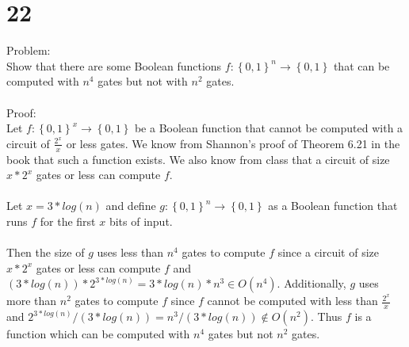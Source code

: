 \documentclass[letterpaper,notitlepage,twoside]{article}
\begin{document}
\section*{22}
Problem:
\\
Show that there are some Boolean functions $f: \left\{ 0,1 \right\}^n \rightarrow \left\{ 0,1 \right\}$ that can be computed with $n^4$ gates but not with $n^2$ gates.
\\\\
Proof:
\\
Let $f: \left\{ 0,1 \right\}^x \rightarrow \left\{ 0,1 \right\}$ be a Boolean function that cannot be computed with a circuit of $\frac{2^x}{x}$ or less gates. We know from Shannon's proof of Theorem 6.21 in the book that such a function exists. We also know from class that a circuit of size $x*2^x$ gates or less can compute $f$.
\\\\
Let $x = 3*log(n)$ and define $g: \left\{ 0,1 \right\}^n \rightarrow \left\{ 0,1 \right\}$ as a Boolean function that runs $f$ for the first $x$ bits of input.
\\\\
Then the size of $g$ uses less than $n^4$ gates to compute $f$ since a circuit of size $x*2^x$ gates or less can compute $f$ and $(3*log(n))*2^{3*log(n)} = 3*log(n)*n^3 \in O(n^4)$. Additionally, $g$ uses more than $n^2$ gates to compute $f$ since $f$ cannot be computed with less than $\frac{2^x}{x}$ and $2^{3*log(n)} / (3*log(n)) = n^3 / (3*log(n)) \notin O(n^2)$. Thus $f$ is a function which can be computed with $n^4$ gates but not $n^2$ gates.

\end{document}
